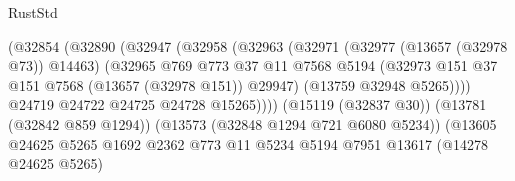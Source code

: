\begin{lexlean}{RustStd}
\begin{coremodule}
                                            (@32854
                                              (@32890
                                                (@32947
                                                  (@32958
                                                    (@32963
                                                      (@32971
                                                        (@32977 (@13657 (@32978 @73)) @14463)
                                                        (@32965
                                                          @769
                                                          @773
                                                          @37
                                                          @11
                                                          @7568
                                                          @5194
                                                          (@32973
                                                            @151
                                                            @37
                                                            @151
                                                            @7568
                                                            (@13657 (@32978 @151))
                                                            @29947)
                                                          (@13759 @32948 @5265))))
                                                    @24719
                                                    @24722
                                                    @24725
                                                    @24728
                                                    @15265))))
                                            (@15119 (@32837 @30))
                                            (@13781 (@32842 @859 @1294))
                                            (@13573 (@32848 @1294 @721 @6080 @5234))
                                            (@13605
                                              @24625
                                              @5265
                                              @1692
                                              @2362
                                              @773
                                              @11
                                              @5234
                                              @5194
                                              @7951
                                              @13617
                                              (@14278 @24625 @5265)

\end{coremodule}
\end{lexlean}
